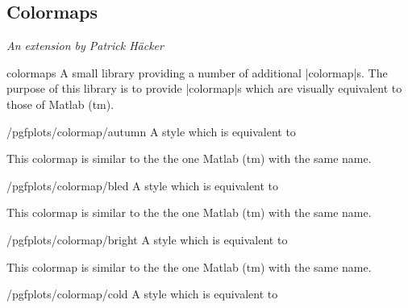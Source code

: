 \subsection{Colormaps}

{\emph{An extension by Patrick H\"acker}}


\begin{pgfplotslibrary}{colormaps}
	A small library providing a number of additional |colormap|s. The purpose of this library is to provide |colormap|s which are visually equivalent to those of Matlab (tm).

\def\matlabcolormaptext{This colormap is similar to the the one Matlab (tm) with the same name.}
\begin{stylekey}{/pgfplots/colormap/autumn}
	A style which is equivalent to 
\begin{codeexample}
\end{codeexample}


	\matlabcolormaptext
\end{stylekey}

\begin{stylekey}{/pgfplots/colormap/bled}
	A style which is equivalent to 
\begin{codeexample}
\end{codeexample}


	\matlabcolormaptext
\end{stylekey}

\begin{stylekey}{/pgfplots/colormap/bright}
	A style which is equivalent to 
\begin{codeexample}
\end{codeexample}


	\matlabcolormaptext
\end{stylekey}

\begin{stylekey}{/pgfplots/colormap/cold}
	A style which is equivalent to 
\begin{codeexample}
\end{codeexample}


\end{stylekey}
\end{pgfplotslibrary}
